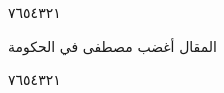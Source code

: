 \documentclass[11pt, a4paper]{article}
\begin{document}
{\begin{center}
        \hfill\textarabic{٧}\hfill\textarabic{٦}\hfill\textarabic{٥}\hfill\textarabic{٤}\hfill\textarabic{٣}\hfill\textarabic{٢}\hfill\textarabic{١}
        \end{center}


\vspace{0.5\baselineskip}\begin{flushright}
\textarabic{المقال أغضب مصطفى في الحكومة}
\end{flushright}

\begin{center}
        \hfill\textarabic{٧}\hfill\textarabic{٦}\hfill\textarabic{٥}\hfill\textarabic{٤}\hfill\textarabic{٣}\hfill\textarabic{٢}\hfill\textarabic{١}
        \end{center}


\vspace{0.5\baselineskip}}



\vfill
\end{document}
